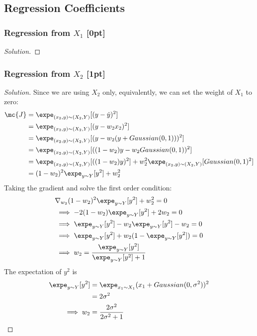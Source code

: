 \documentclass{article}
\begin{document}
	\subsection{Regression Coefficients}
	\subsubsection{Regression from $X_1$ [0pt]}
	\begin{proof}[Solution]
	\end{proof}
	
	\subsubsection{Regression from $X_2$ [1pt]}
	\begin{proof}[Solution]
		Since we are using $X_2$ only, equivalently, we can set the weight of $X_1$ to zero:
		\begin{align}
			\mc{J} &= \expe_{(x_2, y) \sim (X_2, Y)} [(y - \hat{y})^2] \\
			&= \expe_{(x_2, y) \sim (X_2, Y)} [(y - w_2 x_2)^2] \\
			&= \expe_{(x_2, y) \sim (X_2, Y)} [(y - w_2 (y + Gaussian(0, 1)))^2] \\
			&= \expe_{(x_2, y) \sim (X_2, Y)} [((1 - w_2)y - w_2 Gaussian(0, 1) )^2] \\
			&= \expe_{(x_2, y) \sim (X_2, Y)} [((1 - w_2)y)^2] + w_2^2 \expe_{(x_2, y) \sim (X_2, Y)}[Gaussian(0, 1)^2] \\
			&= (1 - w_2)^2 \expe_{y \sim Y} [y^2] + w_2^2
		\end{align}
		Taking the gradient and solve the first order condition:
		\begin{align}
			&\nabla_{w_2} (1 - w_2)^2 \expe_{y \sim Y} [y^2] + w_2^2 = 0 \\
			&\implies - 2(1 - w_2) \expe_{y \sim Y} [y^2] + 2 w_2 = 0 \\
			&\implies \expe_{y \sim Y} [y^2] - w_2 \expe_{y \sim Y} [y^2] - w_2 = 0 \\
			&\implies \expe_{y \sim Y} [y^2] + w_2 (1- \expe_{y \sim Y} [y^2]) = 0 \\
			&\implies w_2 = \frac{\expe_{y \sim Y} [y^2]}{\expe_{y \sim Y} [y^2] + 1}
		\end{align}
		The expectation of $y^2$ is
		\begin{align}
			\expe_{y \sim Y} [y^2] &= \expe_{x_1 \sim X_1} (x_1 + Gaussian(0, \sigma^2))^2 \\
			&= 2 \sigma^2 \\
			\implies w_2 &= \frac{2 \sigma^2}{2 \sigma^2 + 1}
		\end{align}
	\end{proof}
	
\end{document}
